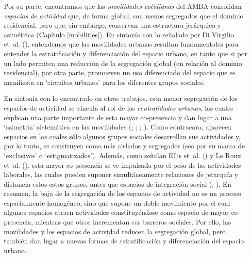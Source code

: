 \documentclass[
  spanish,
  a4paper,%
  chapterprefix=true,%
  DIV=calc,%
  twoside]{scrbook}%
\begin{document}
Por su parte, encontramos que las \emph{movilidades cotidianas} del AMBA
consolidan \emph{espacios de actividad} que, de forma global, son menos
segregados que el dominio residencial, pero que, sin embargo, conservan
una estructura jerárquica y asimétrica (Capítulo \ref{mobilities}). En
sintonía con lo señalado por Di Virgilio et~al. (), entendemos que las
movilidades urbanas resultan fundamentales para entender la
estratificación y diferenciación del espacio urbano, en tanto que si por
un lado permiten una reducción de la segregación global (en relación al
dominio residencial), por otra parte, promueven un uso diferenciado del
espacio que se manifiesta en `circuitos urbanos' para los diferentes
grupos sociales.

En sintonía con lo encontrado en otros trabajos, esta menor segregación
de los espacios de actividad se vincula al rol de las \emph{centralidades
urbanas}, las cuales explican una parte importante de esta mayor
co-presencia y dan lugar a una `asimetría' sistemática en las
movilidades (; ; ; ). Como
contracara, aparecen espacios en los cuales sólo algunos grupos sociales
desarrollan sus actividades y, por lo tanto, se construyen como más
aislados y segregados (sea por su marca de `exclusivos' o
`estigmatizados'). Además, como señalan Ellis et~al. () y Le Roux et~al. (), esta
mayor co-presencia se ve impulsada por el peso de las actividades
laborales, las cuales pueden suponer simultáneamente relaciones de
jerarquía y distancia estos estos grupos, antes que espacios de
integración social (; ). En resumen, la baja
de la segregación de los espacios de actividad no es un proceso
espacialmente homogéneo, sino que supone un doble movimiento por el cual
algunos espacios atraen actividades constituyéndose como espacio de
mayor co-presencia, mientras que otros incrementan sus barreras
sociales. Por ello, las movilidades y los espacios de actividad reducen
la segregación global, pero también dan lugar a nuevas formas de
estratificación y diferenciación del espacio urbano.
\end{document}
